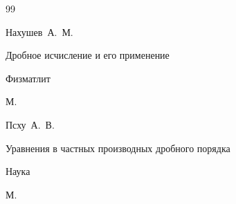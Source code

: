 \begin{thebibliography}{99}




\by Нахушев~А.~М.

\book Дробное исчисление и его применение


\publ Физматлит

\publaddr М.
















\by Псху~А.~В.

\book Уравнения в частных производных дробного порядка


\publ Наука

\publaddr М.

















\end{thebibliography}
